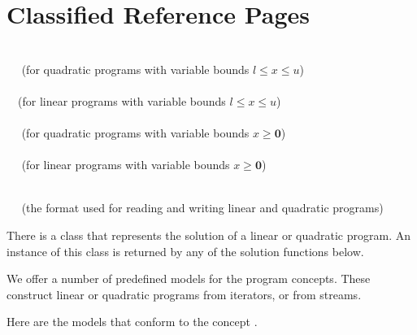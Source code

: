 \label{chapter:QPsolver}

\section{Classified Reference Pages}

\\
$\quad$ (for quadratic programs with variable bounds $l\leq x \leq u$) \\
 \\
$\quad$(for linear programs with variable bounds $l\leq x \leq u$)\\
\\
$\quad$ (for quadratic programs with variable bounds $x\geq\mathbf{0}$) \\
\\
$\quad$ (for linear programs with variable bounds $x\geq\mathbf{0}$)

\\
$\quad$ (the format used for reading and writing linear and quadratic 
programs)


There is a class that represents the solution of a linear
or quadratic program. An instance of this class is returned by any of 
the solution functions below.


We offer a number of predefined models for the program concepts. These
construct linear or quadratic programs from iterators, or from streams.

Here are the models that conform to the concept 
. 

